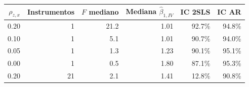 \begin{tabular}{rrrrrr}
\toprule
$\rho_{z,x}$ & Instrumentos & $F$ mediano & Mediana $\hat\beta_{1,IV}$ & IC 2SLS & IC AR \\
\midrule
0.20 & 1 & 21.2 & 1.01 & 92.7\% & 94.8\% \\
0.10 & 1 & 5.1 & 1.01 & 90.7\% & 94.0\% \\
0.05 & 1 & 1.3 & 1.23 & 90.1\% & 95.1\% \\
0.00 & 1 & 0.5 & 1.80 & 87.1\% & 95.3\% \\
0.20 & 21 & 2.1 & 1.41 & 12.8\% & 90.8\% \\
\bottomrule
\end{tabular}
